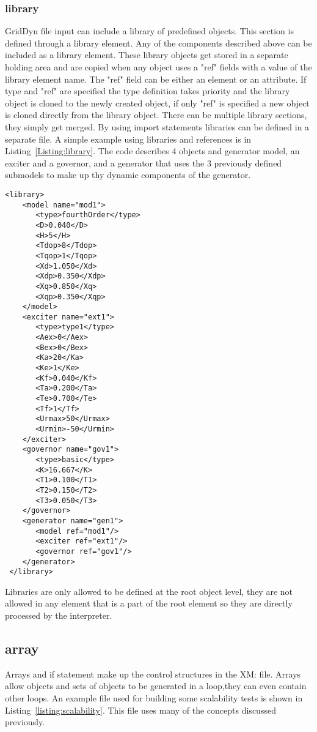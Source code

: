 \documentclass[12pt]{article} %
\begin{document}
 \subsubsection{library}
 GridDyn file input can include a library of predefined objects.  This section is defined through a library element.  Any of the components described above can be included as a library element.  These library objects get stored in a separate holding area and are copied when any object uses a "ref" fields with a value of the library element name.   The "ref" field can be either an element or an attribute.  If type and "ref" are specified the type definition takes priority and the library object is cloned to the newly created object, if only "ref" is specified a new object is cloned directly from the library object.  There can be multiple library sections, they simply get merged.  By using import statements libraries can be defined in a separate file.  A simple example using libraries and references is in Listing~\ref{Listing:library}.  The code describes 4  objects and generator model, an exciter and a governor, and a generator that uses the 3 previously defined submodels to make up thy dynamic components of the generator.
 \begin{lstlisting}[label={Listing:library}, caption={XML code example of a library element}]
 <library>
    <model name="mod1">
       <type>fourthOrder</type>
       <D>0.040</D>
       <H>5</H>
       <Tdop>8</Tdop>
       <Tqop>1</Tqop>
       <Xd>1.050</Xd>
       <Xdp>0.350</Xdp>
       <Xq>0.850</Xq>
       <Xqp>0.350</Xqp>
    </model>
    <exciter name="ext1">
       <type>type1</type>
       <Aex>0</Aex>
       <Bex>0</Bex>
       <Ka>20</Ka>
       <Ke>1</Ke>
       <Kf>0.040</Kf>
       <Ta>0.200</Ta>
       <Te>0.700</Te>
       <Tf>1</Tf>
       <Urmax>50</Urmax>
       <Urmin>-50</Urmin>
    </exciter>
    <governor name="gov1">
       <type>basic</type>
       <K>16.667</K>
       <T1>0.100</T1>
       <T2>0.150</T2>
       <T3>0.050</T3>
    </governor>
    <generator name="gen1">
       <model ref="mod1"/>
       <exciter ref="ext1"/>
       <governor ref="gov1"/>
    </generator>
 </library>
 \end{lstlisting}

 Libraries are only allowed to be defined at the root object level, they are not allowed in any element that is a part of the root element so they are directly processed by the interpreter.

 \subsection{array}
 Arrays and if statement make up the control structures in the XM: file.  Arrays allow objects and sets of objects to be generated in a loop,they can even contain other loops.  An example file used for building some scalability tests is shown in Listing~\ref{listing:scalability}.  This file uses many of the concepts discussed previously.
\end{document}
